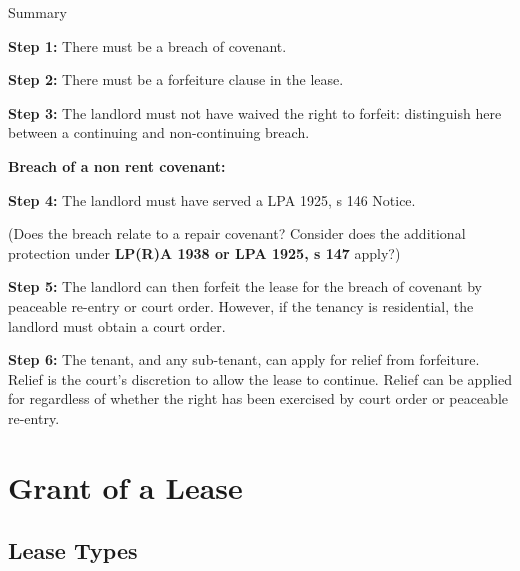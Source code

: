 \documentclass[
]{article}
\newenvironment{env-fdd3b853-72b2-4779-a214-b5da0ccdb5e7}
{
    \savenotes\tcolorbox[blanker,breakable,left=5pt,borderline west={2pt}{-4pt}{gray}]
}
{
    \endtcolorbox\spewnotes
}
\begin{document}
\begin{env-fdd3b853-72b2-4779-a214-b5da0ccdb5e7}

Summary

\textbf{Step 1:} There must be a breach of covenant.

\textbf{Step 2:} There must be a forfeiture clause in the lease.

\textbf{Step 3:} The landlord must not have waived the right to forfeit:
distinguish here between a continuing and non-continuing breach.

\textbf{Breach of a non rent covenant:}

\textbf{Step 4:} The landlord must have served a LPA 1925, s 146 Notice.

(Does the breach relate to a repair covenant? Consider does the
additional protection under \textbf{LP(R)A 1938 or LPA 1925, s 147}
apply?)

\textbf{Step 5:} The landlord can then forfeit the lease for the breach
of covenant by peaceable re-entry or court order. However, if the
tenancy is residential, the landlord must obtain a court order.

\textbf{Step 6:} The tenant, and any sub-tenant, can apply for relief
from forfeiture. Relief is the court's discretion to allow the lease to
continue. Relief can be applied for regardless of whether the right has
been exercised by court order or peaceable re-entry.

\end{env-fdd3b853-72b2-4779-a214-b5da0ccdb5e7}

\hypertarget{grant-of-a-lease}{%
\section{Grant of a Lease}\label{grant-of-a-lease}}

\hypertarget{lease-types}{%
\subsection{Lease Types}\label{lease-types}}
\end{document}
